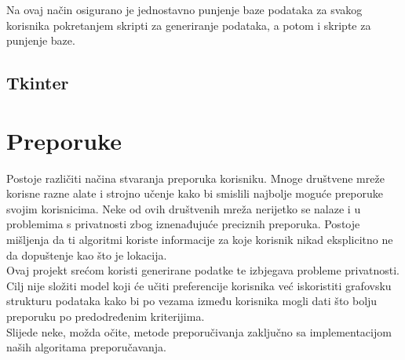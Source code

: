 \documentclass[titlepage, 12pt]{scrartcl}
\begin{document}
Na ovaj način osigurano je jednostavno punjenje baze podataka za svakog korisnika pokretanjem skripti za generiranje podataka, a potom i skripte za punjenje baze.
\subsection{Tkinter}
\newpage

\section{Preporuke}
Postoje različiti načina stvaranja preporuka korisniku. Mnoge društvene mreže korisne razne alate i strojno učenje kako bi smislili najbolje moguće preporuke svojim korisnicima.
Neke od ovih društvenih mreža nerijetko se nalaze i u problemima s privatnosti zbog iznenađujuće preciznih preporuka.
Postoje mišljenja da ti algoritmi koriste informacije za koje korisnik nikad eksplicitno ne da dopuštenje kao što je lokacija. \\
Ovaj projekt srećom koristi generirane podatke te izbjegava probleme privatnosti. Cilj nije složiti model koji će učiti preferencije korisnika već iskoristiti grafovsku strukturu podataka kako bi po vezama između korisnika mogli dati što bolju preporuku po predodređenim kriterijima. \\
Slijede neke, možda očite, metode preporučivanja zaključno sa implementacijom naših algoritama preporučavanja.
\end{document}
